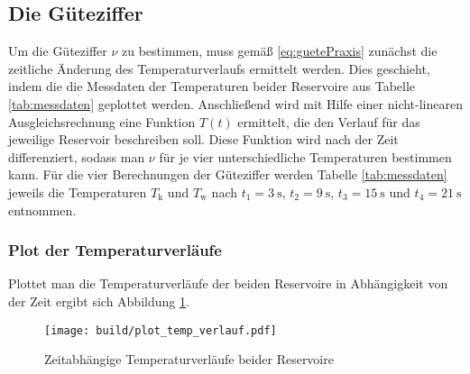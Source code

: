 \subsection{Die Güteziffer}
Um die Güteziffer $\nu$ zu bestimmen, muss gemäß \eqref{eq:guetePraxis} zunächst
die zeitliche Änderung des Temperaturverlaufs ermittelt werden.
Dies geschieht, indem die die Messdaten der Temperaturen beider Reservoire aus Tabelle \ref{tab:messdaten} geplottet werden.
Anschließend wird mit Hilfe einer nicht-linearen Ausgleichsrechnung eine Funktion $T \left(t\right)$ ermittelt, die den Verlauf 
für das jeweilige Reservoir beschreiben soll.
Diese Funktion wird nach der Zeit differenziert, sodass man $\nu$ für je vier unterschiedliche Temperaturen bestimmen kann.
Für die vier Berechnungen der Güteziffer werden Tabelle \ref{tab:messdaten} jeweils die Temperaturen $T_{\text{k}}$ und $T_{\text{w}}$ nach 
$t_1 = \qty[]{3}{\s}$, $t_2 = \qty[]{9}{\s}$, $t_3 = \qty[]{15}{\s}$ und $t_4 = \qty[]{21}{\s}$ entnommen.


\subsubsection{Plot der Temperaturverläufe}
Plottet man die Temperaturverläufe der beiden Reservoire in Abhängigkeit von der Zeit ergibt sich Abbildung \ref{fig:temperaturverlauf}.

\begin{figure}
    \texttt{[image: build/plot\_temp\_verlauf.pdf]}
    \caption[]{Zeitabhängige Temperaturverläufe beider Reservoire}
    \label{fig:temperaturverlauf}
\end{figure}


